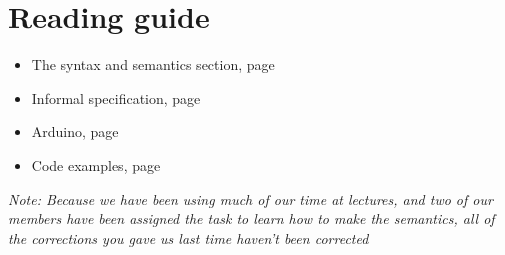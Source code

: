 \section{Reading guide}

\begin{itemize}
	\item The syntax and semantics section, page \pageref{analysis:syntax-and-semantics}
	\item Informal specification, page \pageref{analysis:informal-specification}
	\item Arduino, page \pageref{analysis:arduino}
	\item Code examples, page \pageref{analysis:syntax-examples}
\end{itemize}

\textit{Note: Because we have been using much of our time at lectures, and two of our members have been assigned the task to learn how to make the semantics, all of the corrections you gave us last time haven't been corrected}
